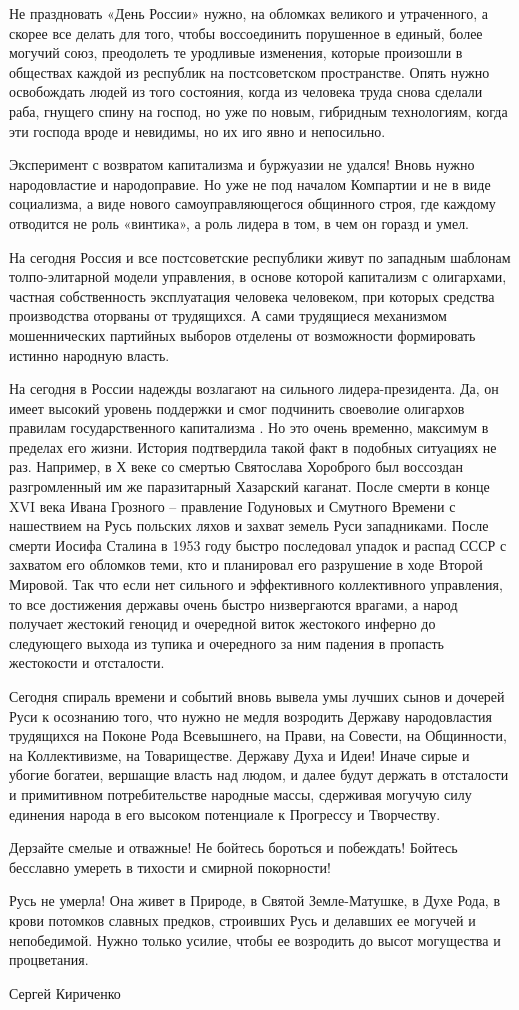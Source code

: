 Не праздновать «День России» нужно, на обломках великого и утраченного, а
скорее все делать для того, чтобы воссоединить порушенное в единый, более
могучий союз, преодолеть те уродливые изменения, которые произошли в обществах
каждой из республик на постсоветском пространстве. Опять нужно освобождать
людей из того состояния, когда из человека труда снова сделали раба, гнущего
спину на господ, но уже по новым, гибридным технологиям, когда эти господа
вроде и невидимы, но их иго явно и непосильно. 

Эксперимент с возвратом капитализма и буржуазии не удался! Вновь нужно
народовластие и народоправие. Но уже не под началом Компартии и не в виде
социализма, а виде нового самоуправляющегося общинного строя, где каждому
отводится не роль «винтика», а роль лидера в том, в чем он горазд и умел.

На сегодня Россия и все постсоветские республики живут по западным шаблонам
толпо-элитарной модели управления, в основе которой капитализм с олигархами,
частная собственность эксплуатация человека человеком, при которых средства
производства оторваны от трудящихся. А сами трудящиеся механизмом мошеннических
партийных выборов отделены от возможности формировать истинно народную власть.

На сегодня в России надежды возлагают на сильного лидера-президента. Да, он
имеет высокий уровень поддержки и смог подчинить своеволие олигархов правилам
государственного капитализма . Но это очень временно, максимум в пределах его
жизни. История подтвердила такой факт в подобных ситуациях не раз. Например, в
Х веке со смертью Святослава Хороброго был воссоздан разгромленный им же
паразитарный Хазарский каганат. После смерти в конце XVI века Ивана Грозного –
правление Годуновых и Смутного Времени с нашествием на Русь польских ляхов и
захват земель Руси западниками. После смерти Иосифа Сталина в 1953 году быстро
последовал упадок  и распад СССР с захватом его обломков теми, кто и планировал
его разрушение в ходе Второй Мировой. Так что если нет сильного и эффективного
коллективного управления, то все достижения державы очень быстро низвергаются
врагами, а народ получает жестокий геноцид и очередной виток жестокого инферно
до следующего выхода из тупика и очередного за ним падения в пропасть
жестокости и отсталости.

Сегодня спираль времени и событий вновь вывела умы лучших сынов и дочерей Руси
к осознанию того, что нужно не медля возродить Державу народовластия трудящихся
на Поконе Рода Всевышнего, на Прави, на Совести, на Общинности, на
Коллективизме, на Товариществе. Державу Духа и Идеи! Иначе сирые и убогие
богатеи, вершащие власть над людом, и далее будут держать в отсталости и
примитивном потребительстве народные массы, сдерживая могучую силу единения
народа в его высоком потенциале к Прогрессу и Творчеству.

Дерзайте смелые и отважные! Не бойтесь бороться и побеждать! Бойтесь бесславно умереть в тихости и смирной покорности!

Русь не умерла! Она живет в Природе, в Святой Земле-Матушке, в Духе Рода, в
крови потомков славных предков, строивших Русь и делавших ее могучей и
непобедимой. Нужно только усилие, чтобы ее возродить до высот могущества и
процветания.

Сергей Кириченко
